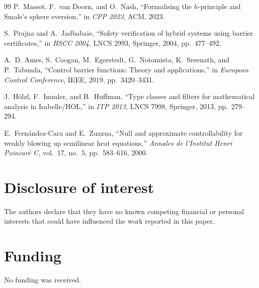 \documentclass[11pt,a4paper]{article}
\theoremstyle{plain}
\theoremstyle{definition}
\theoremstyle{remark}
\begin{document}
\begin{thebibliography}{99}
P.~Massot, F.~van Doorn, and O.~Nash,
``Formalising the $h$-principle and Smale's sphere eversion,''
in \emph{CPP 2023}, ACM, 2023.

S.~Prajna and A.~Jadbabaie,
``Safety verification of hybrid systems using barrier certificates,''
in \emph{HSCC 2004}, LNCS 2993, Springer, 2004, pp.~477--492.

A.~D. Ames, S.~Coogan, M.~Egerstedt, G.~Notomista, K.~Sreenath,
and P.~Tabuada,
``Control barrier functions: Theory and applications,''
in \emph{European Control Conference}, IEEE, 2019, pp.~3420--3431.

J.~H\"olzl, F.~Immler, and B.~Huffman,
``Type classes and filters for mathematical analysis in Isabelle/HOL,''
in \emph{ITP 2013}, LNCS 7998, Springer, 2013, pp.~279--294.

E.~Fern\'{a}ndez-Cara and E.~Zuazua,
``Null and approximate controllability for weakly blowing up semilinear
heat equations,''
\emph{Annales de l'Institut Henri Poincar\'{e} C}, vol.~17, no.~5,
pp.~583--616, 2000.

\end{thebibliography}

\section*{Disclosure of interest}

The authors declare that they have no known competing financial or
personal interests that could have influenced the work reported in
this paper.

\section*{Funding}

No funding was received.
\end{document}
